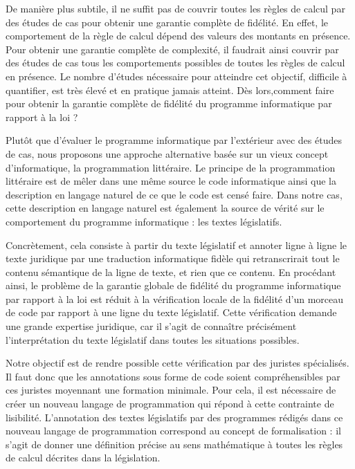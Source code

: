 De manière plus subtile, il ne suffit pas de couvrir toutes les règles de calcul par des études de cas pour obtenir une garantie complète de fidélité. En effet, le comportement de la règle de calcul dépend des valeurs des montants en présence. Pour obtenir une garantie complète de complexité, il faudrait ainsi couvrir par des études de cas tous les comportements possibles de toutes les règles de calcul en présence. Le nombre d'études nécessaire pour atteindre cet objectif, difficile à quantifier, est très élevé et en pratique jamais atteint. Dès lors,comment faire pour obtenir la garantie complète de fidélité du programme informatique par rapport à la loi ?

Plutôt que d'évaluer le programme informatique par l'extérieur avec des études de cas, nous proposons une approche alternative basée sur un vieux concept d'informatique, la programmation littéraire. Le principe de la programmation littéraire est de mêler dans une même source le code informatique ainsi que la description en langage naturel de ce que le code est censé faire. Dans notre cas, cette description en langage naturel est également la source de vérité sur le comportement du programme informatique : les textes législatifs.

Concrètement, cela consiste à partir du texte législatif et annoter ligne à ligne le texte juridique par une traduction informatique fidèle qui retranscrirait tout le contenu sémantique de la ligne de texte, et rien que ce contenu. En procédant ainsi, le problème de la garantie globale de fidélité du programme informatique par rapport à la loi est réduit à la vérification locale de la fidélité d'un morceau de code par rapport à une ligne du texte législatif. Cette vérification demande une grande expertise juridique, car il s'agit de connaître précisément l'interprétation du texte législatif dans toutes les situations possibles.

Notre objectif est de rendre possible cette vérification par des juristes spécialisés. Il faut donc que les annotations sous forme de code soient compréhensibles par ces juristes moyennant une formation minimale. Pour cela, il est nécessaire de créer un nouveau langage de programmation qui répond à cette contrainte de lisibilité. L'annotation des textes législatifs par des programmes rédigés dans ce nouveau langage de programmation correspond au concept de formalisation : il s'agit de donner une définition précise au sens mathématique à toutes les règles de calcul décrites dans la législation.

